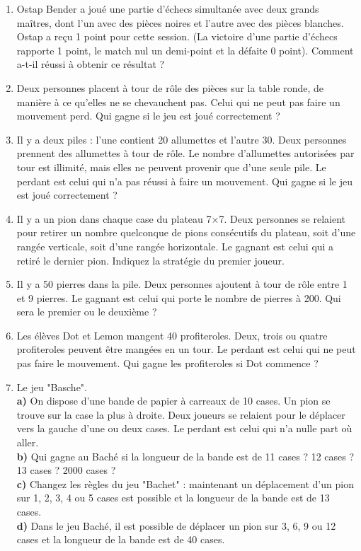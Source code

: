 \documentclass{article}
\begin{document}
\begin{enumerate}
    \item Ostap Bender a joué une partie d'échecs simultanée avec deux grands maîtres, dont l'un avec des pièces noires et l'autre avec des pièces blanches. Ostap a reçu 1 point pour cette session. (La victoire d'une partie d'échecs rapporte 1 point, le match nul un demi-point et la défaite 0 point). Comment a-t-il réussi à obtenir ce résultat ?
    \item Deux personnes placent à tour de rôle des pièces sur la table ronde, de manière à ce qu'elles ne se chevauchent pas. Celui qui ne peut pas faire un mouvement perd. Qui gagne si le jeu est joué correctement ?
    \item Il y a deux piles : l'une contient 20 allumettes et l'autre 30. Deux personnes prennent des allumettes à tour de rôle. Le nombre d'allumettes autorisées par tour est illimité, mais elles ne peuvent provenir que d'une seule pile. Le perdant est celui qui n'a pas réussi à faire un mouvement. Qui gagne si le jeu est joué correctement ?
    \item Il y a un pion dans chaque case du plateau 7×7. Deux personnes se relaient pour retirer un nombre quelconque de pions consécutifs du plateau, soit d'une rangée verticale, soit d'une rangée horizontale. Le gagnant est celui qui a retiré le dernier pion. Indiquez la stratégie du premier joueur.
    \item Il y a 50 pierres dans la pile. Deux personnes ajoutent à tour de rôle entre 1 et 9 pierres. Le gagnant est celui qui porte le nombre de pierres à 200. Qui sera le premier ou le deuxième ?
	\item Les élèves Dot et Lemon mangent 40 profiteroles. Deux, trois ou quatre profiteroles peuvent être mangées en un tour. Le perdant est celui qui ne peut pas faire le mouvement. Qui gagne les profiteroles si Dot commence ?
	\item Le jeu "Basche".\\
		\textbf{a)} On dispose d'une bande de papier à carreaux de 10 cases. Un pion se trouve sur la case la plus à droite. Deux joueurs se relaient pour le déplacer vers la gauche d'une ou deux cases. Le perdant est celui qui n'a nulle part où aller.\\
		\textbf{b)} Qui gagne au Baché si la longueur de la bande est de 11 cases ? 12 cases ? 13 cases ? 2000 cases ?\\
		\textbf{c)} Changez les règles du jeu "Bachet" : maintenant un déplacement d'un pion sur 1, 2, 3, 4 ou 5 cases est possible et la longueur de la bande est de 13 cases.\\
		\textbf{d)} Dans le jeu Baché, il est possible de déplacer un pion sur 3, 6, 9 ou 12 cases et la longueur de la bande est de 40 cases.\\
\end{enumerate}
\end{document}
